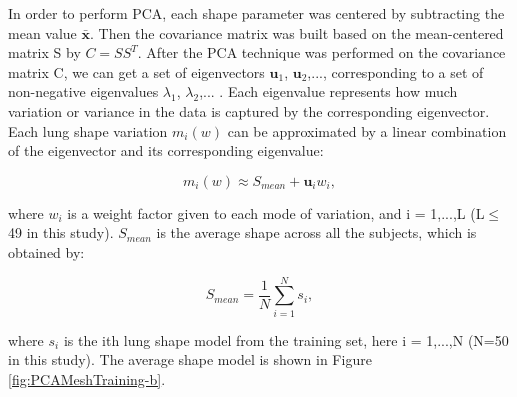 {In order to perform PCA, each shape parameter was centered by subtracting the mean value $\mathbf{\bar{x}}$. Then the covariance matrix was built based on the mean-centered matrix S by $C = SS^T$. After the PCA technique was performed on the covariance matrix C, we can get a set of eigenvectors $\mathbf{u}_1$, $\mathbf{u}_2$,..., corresponding to a set of non-negative eigenvalues $\lambda_1$, $\lambda_2$,... . Each eigenvalue represents how much variation or variance in the data is captured by the corresponding eigenvector. Each lung shape variation $m_i(w)$ can be approximated by a linear combination of the eigenvector and its corresponding eigenvalue:

\begin{equation}
 \label{eq:PCAConstruction3}
 m_i(w) \approx S_{mean} + \mathbf{u}_i w_i,
\end{equation}

\noindent where $w_i$ is a weight factor given to each mode of variation, and i = 1,...,L (L$\leq$ 49 in this study). $S_{mean}$ is the average shape across all the subjects, which is obtained by:

\begin{equation}
 \label{eq:PCAConstruction4}
 S_{mean} = \frac{1}{N}\sum_{i=1}^N s_i,
\end{equation}

 \noindent where $s_i$ is the ith lung shape model from the training set, here i = 1,...,N (N=50 in this study). The average shape model is shown in Figure \ref{fig:PCAMeshTraining-b}.

}
